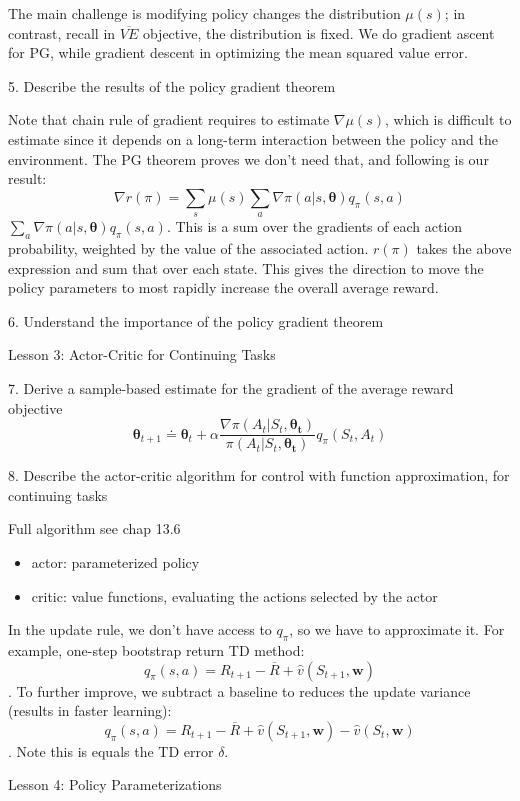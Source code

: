 \documentclass[sutton_barto_notes.tex]{subfiles}
\begin{document}
The main challenge is modifying policy changes the distribution $\mu(s)$; in contrast, recall in $\overline{VE}$ objective, the distribution is fixed. We do gradient ascent for PG, while gradient descent in optimizing the mean squared value error.

5. Describe the results of the policy gradient theorem 

Note that chain rule of gradient requires to estimate $\nabla \mu(s)$, which is difficult to estimate since it depends on a long-term interaction between the policy and the environment. The PG theorem proves we don't need that, and following is our result:
$$\nabla r(\pi) = \sum_s \mu(s) \sum_a \nabla \pi(a|s,\bm{\theta}) q_\pi(s,a)$$
$\sum_a \nabla \pi(a|s,\bm{\theta}) q_\pi(s,a)$. This is a sum over the gradients of each action probability, weighted by the value of the associated action.
$r(\pi)$ takes the above expression and sum that over each state. This gives the direction to move the policy parameters to most rapidly increase the overall average reward.

6. Understand the importance of the policy gradient theorem 

Lesson 3: Actor-Critic for Continuing Tasks 

7. Derive a sample-based estimate for the gradient of the average reward objective 
$$\bm{\theta}_{t+1} \doteq \bm{\theta}_t + \alpha \frac{\nabla \pi(A_t | S_t, \bm{\theta_t})}{\pi(A_t | S_t, \bm{\theta_t})}q_\pi(S_t,A_t)$$

8. Describe the actor-critic algorithm for control with function approximation, for continuing tasks 

Full algorithm see chap 13.6

\begin{itemize}
\item actor: parameterized policy
\item critic: value functions, evaluating the actions selected by the actor
\end{itemize}
In the update rule, we don't have access to $q_\pi$, so we have to approximate it. For example, one-step bootstrap return TD method:
$$q_\pi(s,a) = R_{t+1} - \overline{R}+\hat{v}(S_{t+1}, \bm{w}) $$.
To further improve, we subtract a baseline to reduces the update variance (results in faster learning):
$$q_\pi(s,a) = R_{t+1} - \overline{R}+\hat{v}(S_{t+1}, \bm{w}) - \hat{v}(S_t, \bm{w}) $$.
Note this is equals the TD error $\delta$.

Lesson 4: Policy Parameterizations 
\end{document}
